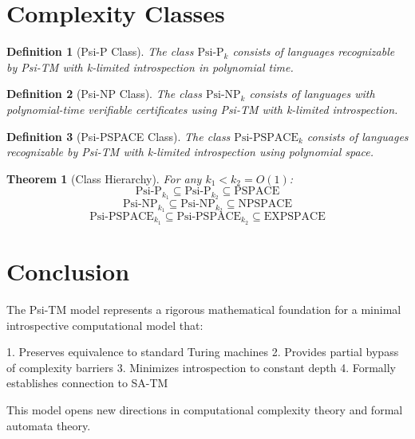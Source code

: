 \documentclass[11pt]{article}
\newtheorem{definition}{Definition}
\newtheorem{theorem}{Theorem}
\begin{document}
\section{Complexity Classes}

\begin{definition}[Psi-P Class]
The class $\text{Psi-P}_k$ consists of languages recognizable by Psi-TM with k-limited introspection in polynomial time.
\end{definition}

\begin{definition}[Psi-NP Class]
The class $\text{Psi-NP}_k$ consists of languages with polynomial-time verifiable certificates using Psi-TM with k-limited introspection.
\end{definition}

\begin{definition}[Psi-PSPACE Class]
The class $\text{Psi-PSPACE}_k$ consists of languages recognizable by Psi-TM with k-limited introspection using polynomial space.
\end{definition}

\begin{theorem}[Class Hierarchy]
For any $k_1 < k_2 = O(1)$:
$$\text{Psi-P}_{k_1} \subseteq \text{Psi-P}_{k_2} \subseteq \text{PSPACE}$$
$$\text{Psi-NP}_{k_1} \subseteq \text{Psi-NP}_{k_2} \subseteq \text{NPSPACE}$$
$$\text{Psi-PSPACE}_{k_1} \subseteq \text{Psi-PSPACE}_{k_2} \subseteq \text{EXPSPACE}$$
\end{theorem}

\section{Conclusion}

The Psi-TM model represents a rigorous mathematical foundation for a minimal introspective computational model that:

1. Preserves equivalence to standard Turing machines
2. Provides partial bypass of complexity barriers
3. Minimizes introspection to constant depth
4. Formally establishes connection to SA-TM

This model opens new directions in computational complexity theory and formal automata theory.
\end{document}
